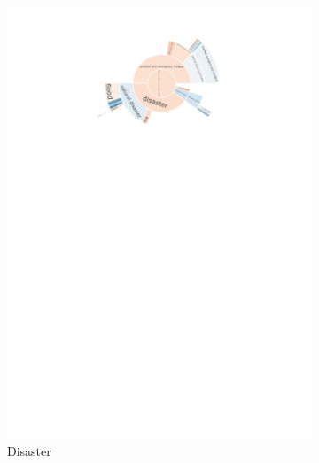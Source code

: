 \begin{figure}[!htbp]
\begin{subfigure}{0.45\textwidth}
		\includegraphics[trim={0 0 0 0},clip,width=\linewidth]{figures/baly_iptc_weighted_prop_total_leaning_diff_zoom_disaster.pdf}
		\caption{Disaster}
            \label{fig:baly_iptc_weighted_prop_total_leaning_diff_zoom_disaster}
	\end{subfigure}
	\begin{subfigure}{0.45\textwidth}

\end{subfigure}
\end{figure}
